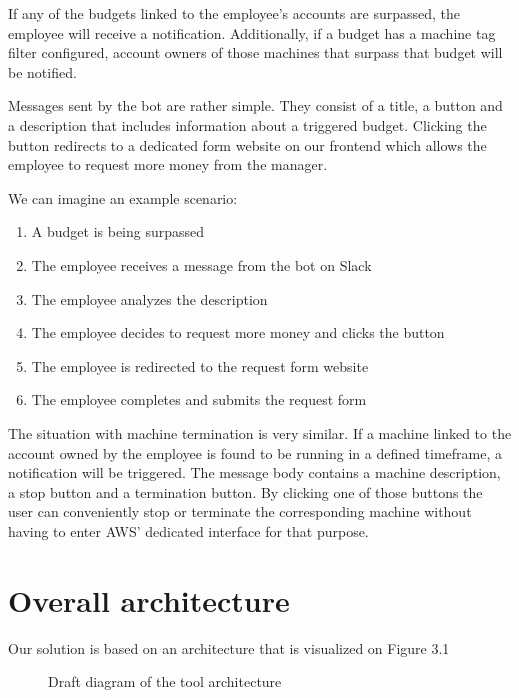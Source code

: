 \documentclass[licencjacka,en]{thesisclass}
\begin{document}
    If any of the budgets linked to the employee's accounts are surpassed,
    the employee will receive a notification.
    Additionally, if a budget has a machine tag filter configured,
    account owners of those machines that surpass that budget will be notified.

    Messages sent by the bot are rather simple.
    They consist of a title, a button and a description that includes
    information about a triggered budget.
    Clicking the button redirects to a dedicated form website on our frontend
    which allows the employee to request more money from the manager.

    \bigskip

    We can imagine an example scenario:
    \begin{enumerate}
        \item A budget is being surpassed
        \item The employee receives a message from the bot on Slack
        \item The employee analyzes the description
        \item The employee decides to request more money and clicks the button
        \item The employee is redirected to the request form website
        \item The employee completes and submits the request form
    \end{enumerate}

    \bigskip

    The situation with machine termination is very similar.
    If a machine linked to the account owned by the employee
    is found to be running in a defined timeframe, a notification will be triggered.
    The message body contains a machine description, a stop button and a termination button.
    By clicking one of those buttons the user can conveniently
    stop or terminate the corresponding machine without having
    to enter AWS' dedicated interface for that purpose.


    \section{Overall architecture}
    Our solution is based on an architecture that is visualized on Figure 3.1

    \begin{figure}[!htb]
      \caption{\label{fig:arch-diag} Draft diagram of the tool architecture}
    \end{figure}
\end{document}
